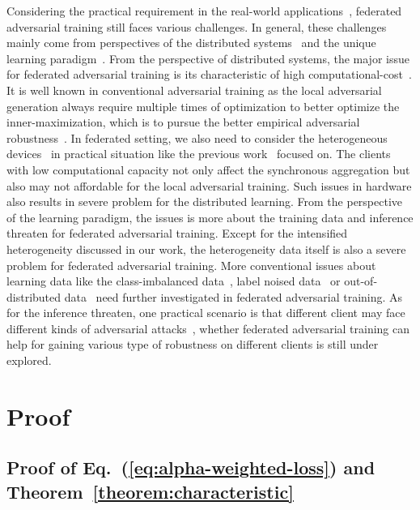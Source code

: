 \documentclass{article} %
\theoremstyle{plain}
\theoremstyle{definition}
\theoremstyle{remark}
\begin{document}
Considering the practical requirement in the real-world applications~\citep{kairouz2019advances}, federated adversarial training still faces various challenges. In general, these challenges mainly come from perspectives of the distributed systems~\citep{lit2020federated} and the unique learning paradigm~\citep{kairouz2019advances}. From the perspective of distributed systems, the major issue for federated adversarial training is its characteristic of high computational-cost~\citep{Madry_adversarial_training}. It is well known in conventional adversarial training as the local adversarial generation always require multiple times of optimization to better optimize the inner-maximization, which is to pursue the better empirical adversarial robustness~\citep{Goodfellow14_Adversarial_examples}. In federated setting, we also need to consider the heterogeneous devices~\citep{kairouz2019advances} in practical situation like the previous work~\citep{hong2021federated} focused on. The clients with low computational capacity not only affect the synchronous aggregation but also may not affordable for the local adversarial training. Such issues in hardware also results in severe problem for the distributed learning. From the perspective of the learning paradigm, the issues is more about the training data and inference threaten for federated adversarial training. Except for the intensified heterogeneity discussed in our work, the heterogeneity data itself is also a severe problem for federated adversarial training. More conventional issues about learning data like the class-imbalanced data~\citep{kovashka2016crowdsourcing}, label noised data~\citep{natarajan2013learning} or out-of-distributed data~\citep{hendrycks2016baseline} need further investigated in federated adversarial training. As for the inference threaten, one practical scenario is that different client may face different kinds of adversarial attacks~\citep{Carlini017_CW,xiao2018spatially}, whether federated adversarial training can help for gaining various type of robustness on different clients is still under explored.


\section{Proof}
\label{sec:app_proof_all}

\subsection{Proof of Eq.~(\ref{eq:alpha-weighted-loss}) and Theorem~\ref{theorem:characteristic}}
\label{sec:app_comp_proof_section41}
\end{document}
